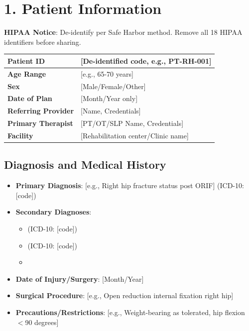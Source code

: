 \documentclass[11pt,letterpaper]{article}
\begin{document}
\section*{1. Patient Information}

\textbf{HIPAA Notice}: De-identify per Safe Harbor method. Remove all 18 HIPAA identifiers before sharing.

\vspace{0.5em}

\begin{tabularx}{\textwidth}{|l|X|}
\hline
\textbf{Patient ID} & [De-identified code, e.g., PT-RH-001] \\ \hline
\textbf{Age Range} & [e.g., 65-70 years] \\ \hline
\textbf{Sex} & [Male/Female/Other] \\ \hline
\textbf{Date of Plan} & [Month/Year only] \\ \hline
\textbf{Referring Provider} & [Name, Credentials] \\ \hline
\textbf{Primary Therapist} & [PT/OT/SLP Name, Credentials] \\ \hline
\textbf{Facility} & [Rehabilitation center/Clinic name] \\ \hline
\end{tabularx}

\vspace{1em}

\subsection*{Diagnosis and Medical History}

\begin{itemize}[leftmargin=*]
    \item \textbf{Primary Diagnosis}: [e.g., Right hip fracture status post ORIF] (ICD-10: [code])
    \item \textbf{Secondary Diagnoses}:
    \begin{itemize}
        \item [e.g., Osteoporosis] (ICD-10: [code])
        \item [e.g., Hypertension] (ICD-10: [code])
        \item [Additional relevant conditions]
    \end{itemize}
    \item \textbf{Date of Injury/Surgery}: [Month/Year]
    \item \textbf{Surgical Procedure}: [e.g., Open reduction internal fixation right hip]
    \item \textbf{Precautions/Restrictions}: [e.g., Weight-bearing as tolerated, hip flexion $<$90 degrees]
\end{itemize}
\end{document}
